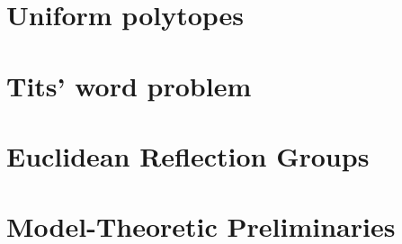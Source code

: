\documentclass[a4paper,11pt, titlepage]{article}
\begin{document}
\section{Uniform polytopes}


\section{Tits' word problem}\label{word}


\section{Euclidean Reflection Groups}


\appendix
\section{Model-Theoretic Preliminaries}\label{Model Theory}



\end{document}
